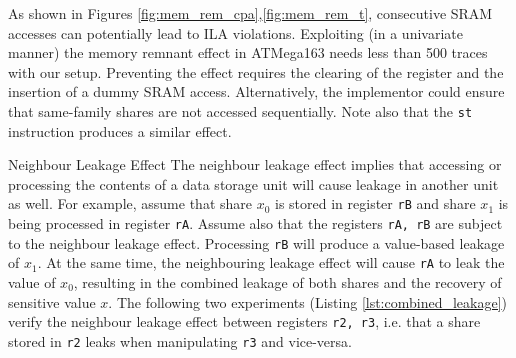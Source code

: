 As shown in Figures \ref{fig:mem_rem_cpa},\ref{fig:mem_rem_t}, consecutive SRAM accesses can potentially lead to ILA violations. Exploiting (in a univariate manner) the memory remnant effect in ATMega163 needs less than 500 traces with our setup. Preventing the effect requires the clearing of the register and the insertion of a dummy SRAM access. Alternatively, the implementor could ensure that same-family shares are not accessed sequentially. Note also that the \texttt{st} instruction produces a similar effect.
\begin{subsection}{Neighbour Leakage Effect}\label{combined_leakage}
The neighbour leakage effect implies that accessing or processing the contents of a data storage unit will cause leakage in another unit as well. For example, assume that share $x_0$ is stored in register \texttt{rB} and share $x_1$ is being processed in register \texttt{rA}. Assume also that the registers \texttt{rA, rB} are subject to the neighbour leakage effect. Processing \texttt{rB} will produce a value-based leakage of $x_1$. At the same time, the neighbouring leakage effect will cause \texttt{rA} to leak the value of $x_0$, resulting in the combined leakage of both shares and the recovery of sensitive value $x$. The following two experiments (Listing \ref{lst:combined_leakage}) verify the neighbour leakage effect between registers \texttt{r2, r3}, i.e. that a share stored in \texttt{r2} leaks when manipulating \texttt{r3} and vice-versa. 




\end{subsection}

